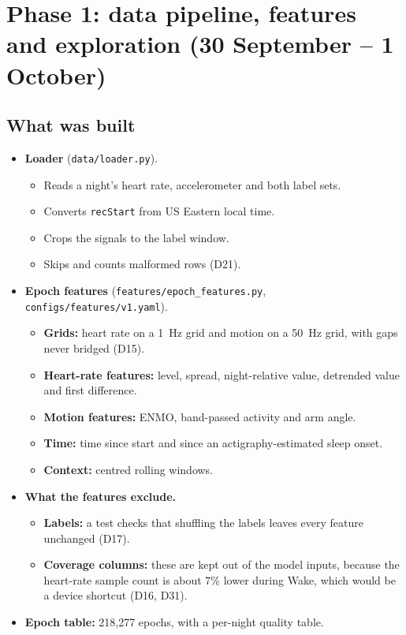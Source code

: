 \documentclass[11pt,a4paper]{article}
\newcommand{\code}[1]{\texttt{#1}}
\newcommand{\D}[1]{D#1}
\begin{document}
\section{Phase 1: data pipeline, features and exploration (30 September -- 1 October)}

\subsection{What was built}
\begin{itemize}
\item \textbf{Loader} (\code{data/loader.py}).
  \begin{itemize}
  \item Reads a night's heart rate, accelerometer and both label sets.
  \item Converts \code{recStart} from US Eastern local time.
  \item Crops the signals to the label window.
  \item Skips and counts malformed rows (\D{21}).
  \end{itemize}
\item \textbf{Epoch features} (\code{features/epoch\_features.py},
\code{configs/features/v1.yaml}).
  \begin{itemize}
  \item \textbf{Grids:} heart rate on a 1~Hz grid and motion on a 50~Hz grid, with gaps never
  bridged (\D{15}).
  \item \textbf{Heart-rate features:} level, spread, night-relative value, detrended value and
  first difference.
  \item \textbf{Motion features:} ENMO, band-passed activity and arm angle.
  \item \textbf{Time:} time since start and since an actigraphy-estimated sleep onset.
  \item \textbf{Context:} centred rolling windows.
  \end{itemize}
\item \textbf{What the features exclude.}
  \begin{itemize}
  \item \textbf{Labels:} a test checks that shuffling the labels leaves every feature unchanged
  (\D{17}).
  \item \textbf{Coverage columns:} these are kept out of the model inputs, because the
  heart-rate sample count is about 7\% lower during Wake, which would be a device shortcut
  (\D{16}, \D{31}).
  \end{itemize}
\item \textbf{Epoch table:} 218,277 epochs, with a per-night quality table.
\end{itemize}
\end{document}
